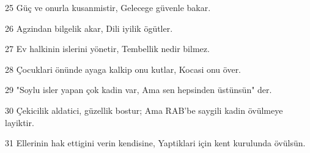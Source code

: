 \par 25 Güç ve onurla kusanmistir, Gelecege güvenle bakar.
\par 26 Agzindan bilgelik akar, Dili iyilik ögütler.
\par 27 Ev halkinin islerini yönetir, Tembellik nedir bilmez.
\par 28 Çocuklari önünde ayaga kalkip onu kutlar, Kocasi onu över.
\par 29 "Soylu isler yapan çok kadin var, Ama sen hepsinden üstünsün" der.
\par 30 Çekicilik aldatici, güzellik bostur; Ama RAB'be saygili kadin övülmeye layiktir.
\par 31 Ellerinin hak ettigini verin kendisine, Yaptiklari için kent kurulunda övülsün.


